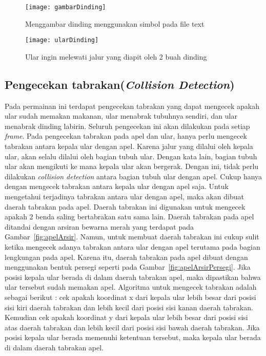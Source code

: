 \begin{figure}[H]
	\centering  
	\texttt{[image: gambarDinding]}  
	\caption[Menggambar dinding menggunakan simbol pada file text]{Menggambar dinding menggunakan simbol pada file text}
	\label{fig:gambarDinding} 
\end{figure}

\begin{figure}[H]
	\centering  
	\texttt{[image: ularDinding]}  
	\caption[Ular ingin melewati jalur yang diapit oleh 2 buah dinding]{Ular ingin melewati jalur yang diapit oleh 2 buah dinding}
	\label{fig:ularDinding} 
\end{figure}

\subsection{Pengecekan tabrakan(\textit{Collision Detection})}
Pada permainan ini terdapat pengecekan tabrakan yang dapat mengecek apakah ular sudah memakan makanan, ular menabrak tubuhnya sendiri, dan ular menabrak dinding labirin. Seluruh pengecekan ini akan dilakukan pada setiap \textit{frame}. Pada pengecekan tabrakan pada apel dan ular, hanya perlu mengecek tabrakan antara kepala ular dengan apel. Karena jalur yang dilalui oleh kepala ular, akan selalu dilalui oleh bagian tubuh ular. Dengan kata lain, bagian tubuh ular akan mengikuti ke mana kepala ular akan bergerak. Dengan ini, tidak perlu dilakukan \textit{collision detection} antara bagian tubuh ular dengan apel. Cukup hanya dengan mengecek tabrakan antara kepala ular dengan apel saja. Untuk mengetahui terjadinya tabrakan antara ular dengan apel, maka akan dibuat daerah tabrakan pada apel. Daerah tabrakan ini digunakan untuk mengecek apakah 2 benda saling bertabrakan satu sama lain. Daerah tabrakan pada apel ditandai dengan arsiran bewarna merah yang terdapat pada Gambar~\ref{fig:apelArsir}. Namun, untuk membuat daerah tabrakan ini cukup sulit ketika mengecek adanya tabrakan antara ular dengan apel terutama pada bagian lengkungan pada apel. Karena itu, daerah tabrakan pada apel dibuat dengan menggunakan bentuk persegi seperti pada Gambar~\ref{fig:apelArsirPersegi}. Jika posisi kepala ular berada di dalam daerah tabrakan apel, maka dipastikan bahwa ular tersebut sudah memakan apel. Algoritma untuk mengecek tabrakan adalah sebagai berikut : cek apakah koordinat x dari kepala ular lebih besar dari posisi sisi kiri daerah tabrakan dan lebih kecil dari posisi sisi kanan daerah tabrakan. Kemudian cek apakah koordinat y dari kepala ular lebih besar dari posisi sisi atas daerah tabrakan dan lebih kecil dari posisi sisi bawah daerah tabrakan. Jika posisi kepala ular berada memenuhi ketentuan tersebut, maka kepala ular berada di dalam daerah tabrakan apel.\\

